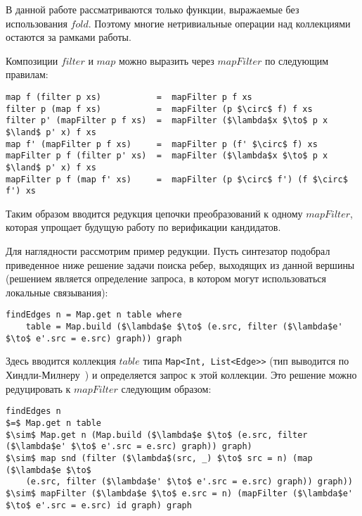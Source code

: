 \documentclass[14pt]{matmex-diploma-custom}
\begin{document}
В данной работе рассматриваются только функции, выражаемые без использования $fold$. Поэтому многие нетривиальные операции над коллекциями остаются за рамками работы.

Композиции $filter$ и $map$ можно выразить через $mapFilter$ по следующим правилам:

\begin{lstlisting}[language=CollectionLang, mathescape=true, frame=none]
map f (filter p xs)           =  mapFilter p f xs
filter p (map f xs)           =  mapFilter (p $\circ$ f) f xs
filter p' (mapFilter p f xs)  =  mapFilter ($\lambda$x $\to$ p x $\land$ p' x) f xs
map f' (mapFilter p f xs)     =  mapFilter p (f' $\circ$ f) xs
mapFilter p f (filter p' xs)  =  mapFilter ($\lambda$x $\to$ p x $\land$ p' x) f xs
mapFilter p f (map f' xs)     =  mapFilter (p $\circ$ f') (f $\circ$ f') xs
\end{lstlisting}

Таким образом вводится редукция цепочки преобразований к одному $mapFilter$, которая упрощает будущую работу по верификации кандидатов.

Для наглядности рассмотрим пример редукции. Пусть синтезатор подобрал приведенное ниже решение задачи поиска ребер, выходящих из данной вершины (решением является определение запроса, в котором могут использоваться локальные связывания):

\begin{lstlisting}[language=SolutionLang, mathescape=true, frame=none]
findEdges n = Map.get n table where
    table = Map.build ($\lambda$e $\to$ (e.src, filter ($\lambda$e' $\to$ e'.src = e.src) graph)) graph
\end{lstlisting}

Здесь вводится коллекция $table$ типа \lstinline[language=SolutionLang]{Map<Int, List<Edge>>} (тип выводится по Хиндли-Милнеру~\cite{Milner}) и определяется запрос к этой коллекции. Это решение можно редуцировать к $mapFilter$ следующим образом:
\begin{lstlisting}[language=SolutionLang, mathescape=true]
findEdges n
$=$ Map.get n table
$\sim$ Map.get n (Map.build ($\lambda$e $\to$ (e.src, filter ($\lambda$e' $\to$ e'.src = e.src) graph)) graph)
$\sim$ map snd (filter ($\lambda$(src, _) $\to$ src = n) (map ($\lambda$e $\to$
    (e.src, filter ($\lambda$e' $\to$ e'.src = e.src) graph)) graph))
$\sim$ mapFilter ($\lambda$e $\to$ e.src = n) (mapFilter ($\lambda$e' $\to$ e'.src = e.src) id graph) graph
\end{lstlisting}
\end{document}
